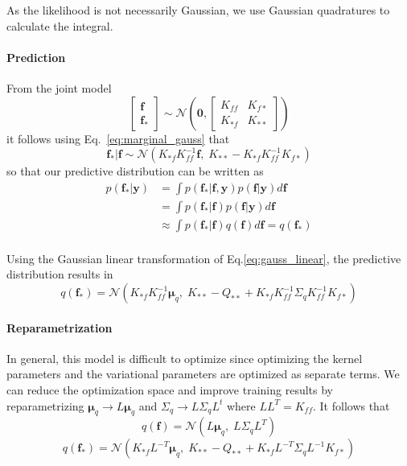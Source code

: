 \documentclass[5p,11pt]{article}
\begin{document}
As the likelihood is not necessarily Gaussian, we use Gaussian quadratures to calculate the integral.

\paragraph{Prediction} From the joint model
\begin{equation}
\begin{bmatrix}\bm{f}\\ \bm{f}_*\end{bmatrix} \sim \mathcal{N}\left(\bm{0}, \begin{bmatrix}K_{ff} & K_{f*}\\ K_{*f} & K_{**}\end{bmatrix} \right)
\end{equation}
it follows using Eq.~\ref{eq:marginal_gauss} that
$$ \bm{f}_*|\bm{f} \sim \mathcal{N}(K_{*f}K_{ff}^{-1}\bm{f},\; K_{**}-K_{*f}K_{ff}^{-1}K_{f*}) $$
so that our predictive distribution can be written as
\begin{equation}
    \begin{aligned}
    p(\bm{f}_*|\bm{y}) &= \int p(\bm{f}_*|\bm{f},\bm{y}) p(\bm{f}|\bm{y}) d\bm{f}\\
    &= \int p(\bm{f}_*|\bm{f}) p(\bm{f}|\bm{y}) d\bm{f}\\
    &\approx \int p(\bm{f}_*|\bm{f}) q(\bm{f}) d\bm{f} = q(\bm{f}_*)\\
    \end{aligned}
\end{equation}

Using the Gaussian linear transformation of Eq.\ref{eq:gauss_linear}, the predictive distribution results in
$$ q(\bm{f}_*) = \mathcal{N}(K_{*f}K_{ff}^{-1}\bm{\mu}_q,\; K_{**}-Q_{**}+K_{*f}K_{ff}^{-1}\Sigma_qK_{ff}^{-1}K_{f*}) $$

\paragraph{Reparametrization}
In general, this model is difficult to optimize since optimizing the kernel parameters and the variational parameters are optimized as separate terms. We can reduce the optimization space and improve training results by reparametrizing $\bm{\mu}_q \to L\bm{\mu}_q$ and $\Sigma_q \to L\Sigma_qL^t$ where $LL^T = K_{ff}$. It follows that
$$ q(\bm{f}) = \mathcal{N}(L\bm{\mu}_q,\; L\Sigma_qL^T) $$
$$ q(\bm{f}_*) = \mathcal{N}(K_{*f}L^{-T}\bm{\mu}_q,\; K_{**} - Q_{**} + K_{*f}L^{-T}\Sigma_qL^{-1}K_{f*}) $$
\end{document}
